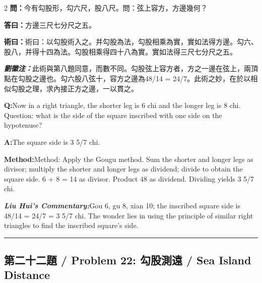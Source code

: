 \documentclass[11pt,a4paper]{article}
\newcommand{\cnwen}{\textcolor{cnlabelfg}{\textbf{問：}}}
\newcommand{\cnda}{\textbf{答曰：}}
\newcommand{\cnshu}{\textcolor{cnlabelfg}{\textbf{術曰：}}}
\newcommand{\cnzhu}{\textcolor{commentarycolor}{\textit{\textbf{劉徽注：}}}}
\newcommand{\enwen}{\textcolor{enlabelfg}{\textbf{Q:}}}
\newcommand{\enda}{\textcolor{enlabelfg}{\textbf{A:}}}
\newcommand{\enshu}{\textcolor{enlabelfg}{\textbf{Method:}}}
\newcommand{\enzhu}{\textcolor{enlabelfg}{\textit{\textbf{Liu Hui's Commentary:}}}}
\begin{document}
\begin{paracol}{2}
\switchcolumn[0]
\cnwen 今有勾股形，勾六尺，股八尺。問：弦上容方，方邊幾何？

\cnda 方邊三尺七分尺之五。

\cnshu 術曰：以勾股術入之。并勾股為法，勾股相乘為實，實如法得方邊。勾六、股八，并得十四為法。勾股相乘得四十八為實。實如法得三尺七分尺之五。

\cnzhu 此術與第八題同意，而數不同。勾股弦上容方者，方之一邊在弦上，兩頂點在勾股之邊也。勾六股八弦十，容方之邊為48/14 = 24/7。此術之妙，在於以相似勾股之理，求內接正方之邊，一以貫之。

\switchcolumn[1]
\enwen Now in a right triangle, the shorter leg is 6 chi and the longer leg is 8 chi. Question: what is the side of the square inscribed with one side on the hypotenuse?

\enda The square side is 3 5/7 chi.

\enshu Method: Apply the Gougu method. Sum the shorter and longer legs as divisor; multiply the shorter and longer legs as dividend; divide to obtain the square side. 6 + 8 = 14 as divisor. Product 48 as dividend. Dividing yields 3 5/7 chi.

\enzhu Gou 6, gu 8, xian 10; the inscribed square side is 48/14 = 24/7 = 3 5/7 chi. The wonder lies in using the principle of similar right triangles to find the inscribed square's side.
\end{paracol}

\bigskip\hrule\bigskip

\subsection{第二十二題 / Problem 22: 勾股測遠 / Sea Island Distance}
\end{document}
